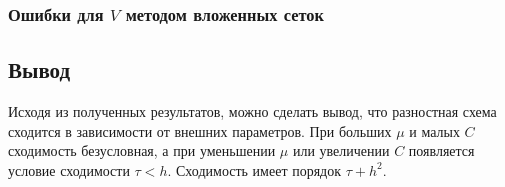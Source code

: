 \subsubsection{Ошибки для $V$ методом вложенных сеток}


\subsection{Вывод}
Исходя из полученных результатов, можно сделать вывод, что разностная схема сходится в зависимости от внешних параметров. При больших $\mu$ и малых $C$ сходимость безусловная, а при уменьшении $\mu$ или увеличении $C$ появляется условие сходимости $\tau < h$. Сходимость имеет порядок $\tau + h^2$.

